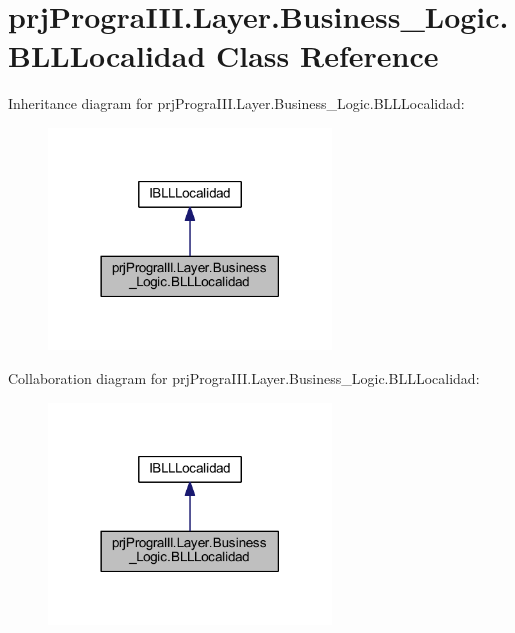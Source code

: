 \hypertarget{classprj_progra_i_i_i_1_1_layer_1_1_business___logic_1_1_b_l_l_localidad}{}\section{prj\+Progra\+I\+I\+I.\+Layer.\+Business\+\_\+\+Logic.\+B\+L\+L\+Localidad Class Reference}
\label{classprj_progra_i_i_i_1_1_layer_1_1_business___logic_1_1_b_l_l_localidad}


Inheritance diagram for prj\+Progra\+I\+I\+I.\+Layer.\+Business\+\_\+\+Logic.\+B\+L\+L\+Localidad\+:
\nopagebreak
\begin{figure}[H]
\begin{center}
\leavevmode
\includegraphics[width=213pt]{classprj_progra_i_i_i_1_1_layer_1_1_business___logic_1_1_b_l_l_localidad__inherit__graph}
\end{center}
\end{figure}


Collaboration diagram for prj\+Progra\+I\+I\+I.\+Layer.\+Business\+\_\+\+Logic.\+B\+L\+L\+Localidad\+:
\nopagebreak
\begin{figure}[H]
\begin{center}
\leavevmode
\includegraphics[width=213pt]{classprj_progra_i_i_i_1_1_layer_1_1_business___logic_1_1_b_l_l_localidad__coll__graph}
\end{center}
\end{figure}
